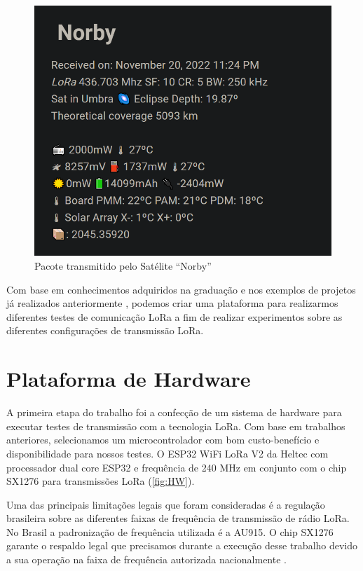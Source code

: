\documentclass[
	12pt,				%
	openright,			%
	twoside,			%
	a4paper,			%
	english,			%
	french,				%
	spanish,			%
	brazil				%
	]{abntex2}
\newcommand{\quotes}[1]{``#1''}
\begin{document}
\begin{figure}[H]
	\caption{\label{fig:Norby}Pacote transmitido pelo Satélite \quotes{Norby}}
	\begin{center}
	    \includegraphics[scale=0.6]{img/Norby.png}
	\end{center}
\end{figure}

Com base em conhecimentos adquiridos na graduação e nos exemplos de projetos já realizados anteriormente \cite{vaz_2020}, podemos criar uma plataforma para realizarmos diferentes testes de comunicação LoRa a fim de realizar experimentos sobre as diferentes configurações de transmissão LoRa.

\section{Plataforma de Hardware}

A primeira etapa do trabalho foi a confecção de um sistema de hardware para executar testes de transmissão com a tecnologia LoRa. Com base em trabalhos anteriores, selecionamos um microcontrolador com bom custo-benefício e disponibilidade para nossos testes. O ESP32 WiFi LoRa V2 da Heltec com processador dual core ESP32 e frequência de 240 MHz em conjunto com o chip SX1276 para transmissões LoRa (\autoref{fig:HW}).

Uma das principais limitações legais que foram consideradas é a regulação brasileira sobre as diferentes faixas de frequência de transmissão de rádio LoRa. No Brasil a padronização de frequência utilizada é a AU915. O chip SX1276 garante o respaldo legal que precisamos durante a execução desse trabalho devido a sua operação na faixa de frequência autorizada nacionalmente \cite{anatel_2017}.
\end{document}
